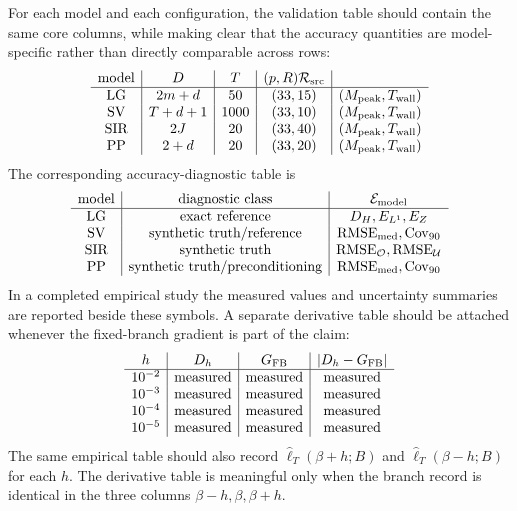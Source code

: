 \documentclass[11pt]{article}
\numberwithin{equation}{section}
\newcommand{\widehatell}{\widehat\ell}
\begin{document}
For each model and each configuration, the validation table should contain the
same core columns, while making clear that the accuracy quantities are
model-specific rather than directly comparable across rows:
\begin{equation}
\begin{array}{c|c|c|c|c}
\text{model}
&D
&T
&(p,R)
\mathcal R_{\rm src}
\\
\hline
\text{LG}
&2m+d
&50
&(33,15)
&(M_{\rm peak},T_{\rm wall})
\\
\text{SV}
&T+d+1
&1000
&(33,10)
&(M_{\rm peak},T_{\rm wall})
\\
\text{SIR}
&2J
&20
&(33,40)
&(M_{\rm peak},T_{\rm wall})
\\
\text{PP}
&2+d
&20
&(33,20)
&(M_{\rm peak},T_{\rm wall})
\end{array}
\label{eq:p27-t1}
\end{equation}
The corresponding accuracy-diagnostic table is
\begin{equation}
\begin{array}{c|c|c}
\text{model}
&\text{diagnostic class}
&\mathcal E_{\rm model}\\
\hline
\text{LG}
&\text{exact reference}
&D_H,E_{L^1},E_Z\\
\text{SV}
&\text{synthetic truth/reference}
&{\rm RMSE}_{\rm med},{\rm Cov}_{90}\\
\text{SIR}
&\text{synthetic truth}
&{\rm RMSE}_{\mathcal O},{\rm RMSE}_{\mathcal U}\\
\text{PP}
&\text{synthetic truth/preconditioning}
&{\rm RMSE}_{\rm med},{\rm Cov}_{90}
\end{array}
\label{eq:p27-t1b}
\end{equation}
In a completed empirical study the measured values and uncertainty summaries
are reported beside these symbols.  A separate derivative table should be
attached whenever the fixed-branch gradient is part of the claim:
\begin{equation}
\begin{array}{c|c|c|c}
h
&D_h
&G_{\rm FB}
&|D_h-G_{\rm FB}|
\\
\hline
10^{-2}&\text{measured}&\text{measured}&\text{measured}\\
10^{-3}&\text{measured}&\text{measured}&\text{measured}\\
10^{-4}&\text{measured}&\text{measured}&\text{measured}\\
10^{-5}&\text{measured}&\text{measured}&\text{measured}
\end{array}
\label{eq:p27-t2}
\end{equation}
The same empirical table should also record
\(\widehatell_T(\beta+h;B)\) and \(\widehatell_T(\beta-h;B)\) for each \(h\).
The derivative table is meaningful only when the branch record is identical in
the three columns \(\beta-h,\beta,\beta+h\).
\end{document}
